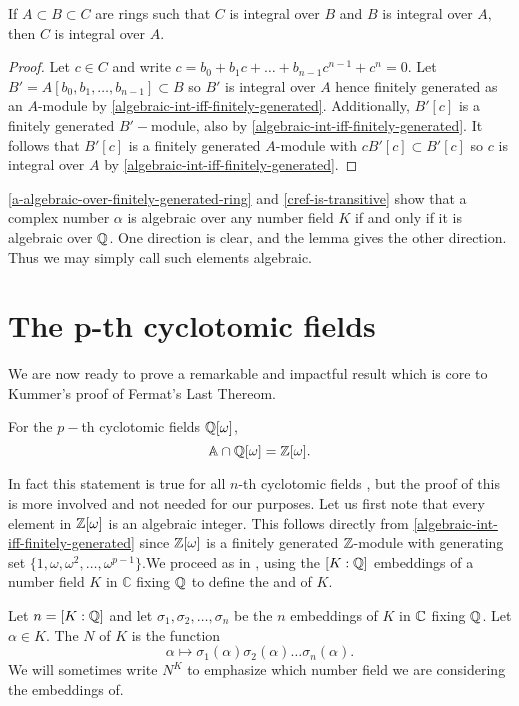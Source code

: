 \begin{lemma}\label{cref-is-transitive}
If $A\subset B\subset C$ are rings such that $C$ is integral over $B$ and $B$ is integral over $A,$ then $C$ is integral over $A$.
\end{lemma}
\begin{proof}
Let $c\in C$ and write $c=b_0+b_1c+\dots +b_{n-1}c^{n-1}+c^n=0$. Let $B'=A[b_0,b_1,\dots,b_{n-1}]\subset B$ so $B'$ is integral over $A$ hence finitely generated as an $A$-module by \cref{algebraic-int-iff-finitely-generated}. Additionally, $B'[c]$ is a finitely generated $B'-$module, also by \cref{algebraic-int-iff-finitely-generated}. It follows that $B'[c]$ is a finitely generated $A$-module with $cB'[c]\subset B'[c]$ so $c$ is integral over $A$ by \cref{algebraic-int-iff-finitely-generated}.
\end{proof}

\cref{a-algebraic-over-finitely-generated-ring} and \cref{cref-is-transitive} show that a complex number $\alpha$ is algebraic over any number field $K$ if and only if it is algebraic over $\mathbb{Q}$. One direction is clear, and the lemma gives the other direction. Thus we may simply call such elements algebraic.


\section{The p-th cyclotomic fields}
We are now ready to prove a remarkable and impactful result which is core to Kummer's proof of Fermat's Last Thereom.
\begin{theorem}\label{algebriac-integers-are-Z[w]}
For the $p-$th cyclotomic fields $\mathbb{Q}[\omega]$,
$$\mathbb{A}\cap\mathbb{Q}[\omega]= \mathbb{Z}[\omega].$$
\end{theorem}
In fact this statement is true for all $n$-th cyclotomic fields \cite{NumberFields}, but the proof of this is more involved and not needed for our purposes. Let us first note that every element in $\mathbb{Z}[\omega]$ is an algebraic integer. This follows directly from \cref{algebraic-int-iff-finitely-generated} since $\mathbb{Z}[\omega]$ is a finitely generated $\mathbb{Z}$-module with generating set $\{1,\omega,\omega^2,\dots,\omega^{p-1}\}$.We proceed as in \cite{NumberFields}, using the $[K:\mathbb{Q}]$ embeddings of a number field $K$ in $\mathbb{C}$ fixing $\mathbb{Q}$ to define the  and  of $K$. 

\begin{definition}
Let $n=[K:\mathbb{Q}]$ and let $\sigma_1,\sigma_2,\dots,\sigma_n$ be the $n$ embeddings of $K$ in $\mathbb{C}$ fixing $\mathbb{Q}$. Let $\alpha\in K$. %
The  $N$ of $K$ is the function
$$\alpha\mapsto\sigma_1(\alpha)\sigma_2(\alpha)\dots \sigma_n(\alpha).$$
We will sometimes write $N^K$ to emphasize which number field we are considering the embeddings of.
\end{definition}

